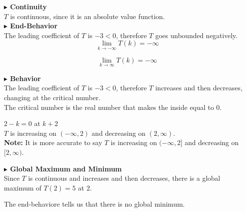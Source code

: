 \documentclass{ximera}
\begin{document}
\begin{example}
\textbf{\textcolor{blue!55!black}{$\blacktriangleright$ Continuity}} \\

$T$ is continuous, since it is an absolute value function. \\






\textbf{\textcolor{blue!55!black}{$\blacktriangleright$ End-Behavior}} \\


The leading coefficient of $T$ is $-3 < 0$, therefore $T$ goes unbounded negatively. \\


\[
\lim\limits_{k \to -\infty} T(k) = -\infty
\]




\[
\lim\limits_{k \to \infty} T(k) = -\infty
\]









\textbf{\textcolor{blue!55!black}{$\blacktriangleright$ Behavior}} \\


The leading coefficient of $T$ is $-3 < 0$, therefore $T$ increases and then decreases, changing at the critical number. \\


The critical number is the real number that makes the inside equal to $0$. \


$2 - k = 0$ at $k + 2$ \\


$T$ is increasing on $(-\infty, 2)$ and decreasing on $(2, \infty)$. \\


\textbf{Note:}  It is more accurate to say $T$ is increasing on $(-\infty, 2]$ and decreasing on $[2, \infty)$.









\textbf{\textcolor{blue!55!black}{$\blacktriangleright$ Global Maximum and Minimum}} \\


Since $T$ is continuous and increases and then decreases, there is a global maximum of $T(2) = 5$ at $2$.



The end-behaviore tells us that there is no global minimum.









\end{example}
\end{document}
